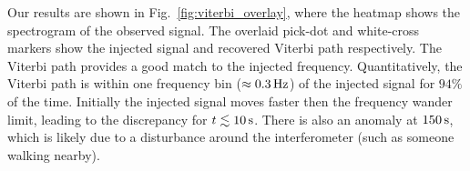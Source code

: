 \documentclass[paper-main.tex]{subfiles}
\begin{document}
Our results are shown in Fig.~\ref{fig:viterbi_overlay}, where the heatmap shows the spectrogram of the observed signal. 
The overlaid pick-dot and white-cross markers show the injected signal and recovered Viterbi path respectively. 
The Viterbi path provides a good match to the injected frequency. 
Quantitatively, the Viterbi path is within one frequency bin ($\approx 0.3\,{\rm Hz}$) of the injected signal for $94\%$ of the time. 
Initially the injected signal moves faster then the frequency wander limit, leading to the discrepancy for $t\lesssim 10\,{\rm s}$. 
There is also an anomaly at $150\,{\rm s}$, which is likely due to a disturbance around the interferometer (such as someone walking nearby).

\end{document}
